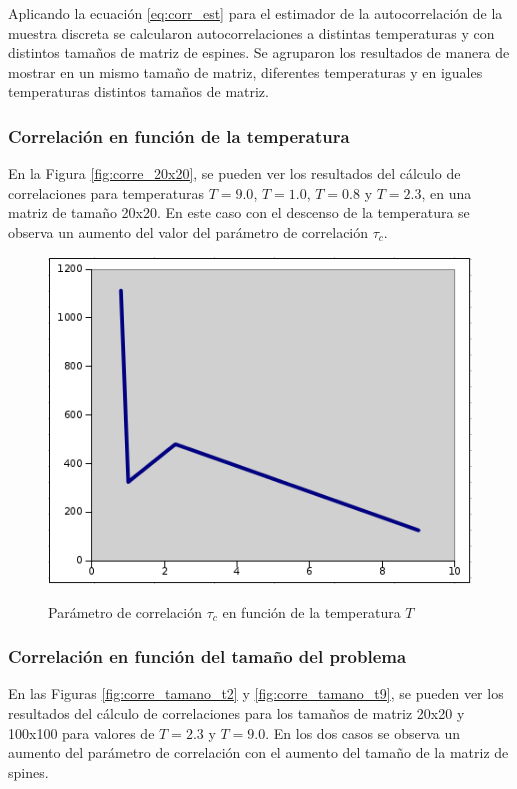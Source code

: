 \documentclass[a4paper,12pt]{article}
\begin{document}
Aplicando la ecuación  \eqref{eq:corr_est}  para el estimador de la 
autocorrelación de la muestra discreta
se calcularon autocorrelaciones a distintas temperaturas y con distintos 
tamaños 
de matriz de espines. Se agruparon los resultados de manera de mostrar en un 
mismo
tamaño de matriz, diferentes temperaturas y en iguales temperaturas distintos 
tamaños de matriz.

\subsubsection{Correlación en función de la temperatura}

En la Figura \eqref{fig:corre_20x20}, se pueden ver los resultados del cálculo
de correlaciones para  temperaturas $T =9.0 $, $T = 1.0 $, $T =0.8 $ y $T = 2.3 
$, en una matriz de tamaño 20x20.
En este caso con el descenso de la temperatura se observa un aumento del valor 
del parámetro
de correlación $\tau_{c}$.


\begin{figure}[h]
   \begin{center}
        \includegraphics[scale=0.6]{corre_temperature.png} \\
        \caption{Parámetro de correlación  $\tau_{c}$ en función de la 
        temperatura $T$}\label{fig:corre_tempe}
    \end{center}
\end{figure}


\subsubsection{Correlación en función del tamaño del problema}
En las Figuras \eqref{fig:corre_tamano_t2} y \eqref{fig:corre_tamano_t9}, se 
pueden 
ver los resultados del cálculo
de correlaciones para los tamaños de matriz 20x20 y 100x100 para valores de $T 
= 2.3$  y $T = 9.0$. 
En los dos casos se observa un aumento del parámetro de correlación con el 
aumento del 
tamaño de la matriz de spines.
\end{document}
